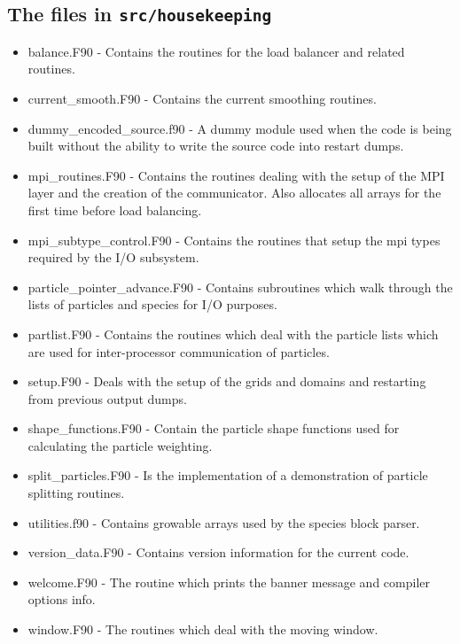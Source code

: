 \documentclass[12pt,a4paper]{article}
\newcommand{\inlinecode}[1]{{\color{warwickred} \bf\texttt{#1}}}
\newcommand{\EPOCH}{{\color{warwickdark}\fontfamily{phv}\selectfont{EPOCH}}}
\begin{document}
\subsection{The files in \inlinecode{src/housekeeping}}
\begin{itemize}
\item balance.F90 - Contains the routines for the load balancer and related
  routines.
\item current\_smooth.F90 - Contains the current smoothing routines.
\item dummy\_encoded\_source.f90 - A dummy module used when the code is
  being built without the ability to write the source code into restart dumps.
\item mpi\_routines.F90 - Contains the routines dealing with the setup of the
  MPI layer and the creation of the communicator. Also allocates all arrays
  for the first time before load balancing.
\item mpi\_subtype\_control.F90 - Contains the routines that setup the mpi
  types required by the I/O subsystem.
\item particle\_pointer\_advance.F90 - Contains subroutines which walk through
  the lists of particles and species for I/O purposes.
\item partlist.F90 - Contains the routines which deal with the particle lists
  which are used for inter-processor communication of particles.
\item setup.F90 - Deals with the setup of the grids and domains and restarting
  from previous output dumps.
\item shape\_functions.F90 - Contain the particle shape functions used for
  calculating the particle weighting.
\item split\_particles.F90 - Is the implementation of a demonstration of
  particle splitting routines.
\item utilities.f90 - Contains growable arrays used by the species block parser.
\item version\_data.F90 - Contains version information for the current {\EPOCH}
  code.
\item welcome.F90 - The routine which prints the banner message and compiler
  options info.
\item window.F90 - The routines which deal with the moving window.
\end{itemize}
\end{document}
